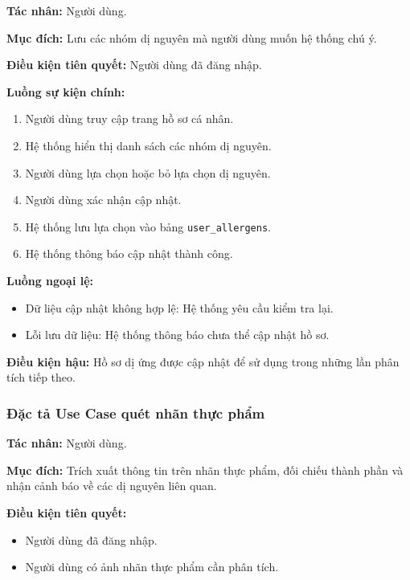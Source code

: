 \textbf{Tác nhân:} Người dùng.

\textbf{Mục đích:} Lưu các nhóm dị nguyên mà người dùng muốn hệ thống chú ý.

\textbf{Điều kiện tiên quyết:} Người dùng đã đăng nhập.

\textbf{Luồng sự kiện chính:}
\begin{enumerate}
	\item Người dùng truy cập trang hồ sơ cá nhân.
	\item Hệ thống hiển thị danh sách các nhóm dị nguyên.
	\item Người dùng lựa chọn hoặc bỏ lựa chọn dị nguyên.
	\item Người dùng xác nhận cập nhật.
	\item Hệ thống lưu lựa chọn vào bảng \texttt{user\_allergens}.
	\item Hệ thống thông báo cập nhật thành công.
\end{enumerate}

\textbf{Luồng ngoại lệ:}
\begin{itemize}
	\item Dữ liệu cập nhật không hợp lệ: Hệ thống yêu cầu kiểm tra lại.
	\item Lỗi lưu dữ liệu: Hệ thống thông báo chưa thể cập nhật hồ sơ.
\end{itemize}

\textbf{Điều kiện hậu:} Hồ sơ dị ứng được cập nhật để sử dụng trong những lần phân tích tiếp theo.

\subsubsection{Đặc tả Use Case quét nhãn thực phẩm}

\textbf{Tác nhân:} Người dùng.

\textbf{Mục đích:} Trích xuất thông tin trên nhãn thực phẩm, đối chiếu thành phần và nhận cảnh báo về các dị nguyên liên quan.

\textbf{Điều kiện tiên quyết:}
\begin{itemize}
	\item Người dùng đã đăng nhập.
	\item Người dùng có ảnh nhãn thực phẩm cần phân tích.
\end{itemize}

